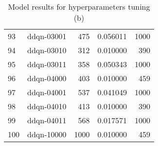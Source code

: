 \documentclass{article}
\begin{document}
\begin{table}
\begin{tabular}{llrrr}
93  &           ddqn-03001 &             475 &   0.056011 &              1000 \\
94  &           ddqn-03010 &             312 &   0.010000 &               390 \\
95  &           ddqn-03011 &             358 &   0.050343 &              1000 \\
96  &           ddqn-04000 &             403 &   0.010000 &               459 \\
97  &           ddqn-04001 &             537 &   0.041049 &              1000 \\
98  &           ddqn-04010 &             413 &   0.010000 &               390 \\
99  &           ddqn-04011 &             568 &   0.017571 &              1000 \\
100 &           ddqn-10000 &            1000 &   0.010000 &               459 \\
\bottomrule
\end{tabular}
\label{table:res_basecase}
\caption{Model results for hyperparameters tuning (b)}
\end{table}
\end{document}
